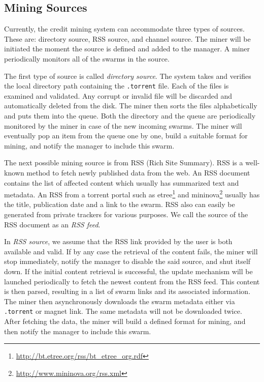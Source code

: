 
\subsection{Mining Sources}
\label{section:msource} 
Currently, the credit mining system can accommodate three types of sources. These are: directory source, RSS source, and channel source. The miner will be initiated the moment the source is defined and added to the manager. A miner periodically monitors all of the swarms in the source.

The first type of source is called \textit{directory source}. The system takes and verifies the local directory path containing the \texttt{.torrent} file. Each of the files is examined and validated. Any corrupt or invalid file will be discarded and automatically deleted from the disk. The miner then sorts the files alphabetically and puts them into the queue. Both the directory and the queue are periodically monitored by the miner in case of the new incoming swarms. The miner will eventually pop an item from the queue one by one, build a suitable format for mining, and notify the manager to include this swarm.

The next possible mining source is from RSS (Rich Site Summary). RSS is a well-known method to fetch newly published data from the web. An RSS document contains the list of affected content which usually has summarized text and metadata. An RSS from a torrent portal such as etree\footnote{\url{http://bt.etree.org/rss/bt_etree_org.rdf}} and mininova\footnote{\url{http://www.mininova.org/rss.xml}} usually has the title, publication date and a link to the swarm. RSS also can easily be generated from private trackers for various purposes. We call the source of the RSS document as an \textit{RSS feed}. 

In \textit{RSS source}, we assume that the RSS link provided by the user is both available and valid. If by any case the retrieval of the content fails, the miner will stop immediately, notify the manager to disable the said source, and shut itself down. If the initial content retrieval is successful, the update mechanism will be launched periodically to fetch the newest content from the RSS feed. This content is then parsed, resulting in a list of swarm links and its associated information. The miner then asynchronously downloads the swarm metadata either via \texttt{.torrent} or magnet link. The same metadata will not be downloaded twice. After fetching the data, the miner will build a defined format for mining, and then notify the manager to include this swarm. 

